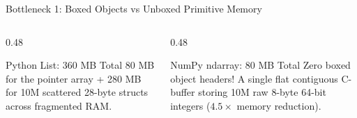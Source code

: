 \begin{frame}{Bottleneck 1: Boxed Objects vs Unboxed Primitive Memory}
  \begin{center}
    \DrawMemoryLayoutComparison
  \end{center}
  \vfill
  \begin{columns}[T,onlytextwidth]
    \begin{column}{0.48\textwidth}
      \begin{ConceptBox}{Python List: 360 MB Total}
        \scriptsize 80 MB for the pointer array + 280 MB for 10M scattered 28-byte  structs across fragmented RAM.
      \end{ConceptBox}
    \end{column}
    \begin{column}{0.48\textwidth}
      \begin{ConceptBox}{NumPy ndarray: 80 MB Total}
        \scriptsize Zero boxed object headers! A single flat contiguous C-buffer storing 10M raw 8-byte 64-bit integers ($4.5\times$ memory reduction).
      \end{ConceptBox}
    \end{column}
  \end{columns}
\end{frame}

